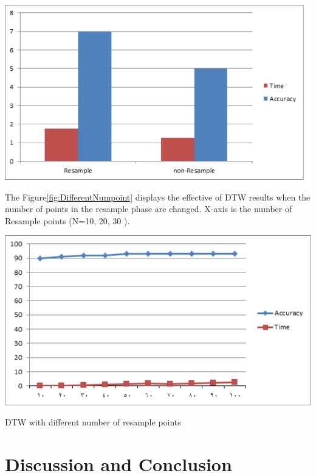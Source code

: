 \documentclass[twoside]{article}
\begin{document}
\begin{multicols}{2}
	\includegraphics[scale=0.5]{../Figures/Resample-NonResample.png}
	\label{fig:Resample-NonResample}

The Figure\ref{fig:DifferentNumpoint} displays the effective of DTW results when the number of points in the resample phase are changed. X-axis is the number of Resample points (N=10, 20, 30 ).

		\includegraphics[scale=0.5]{../Figures/DifferentNumpoint.png}
	\caption{DTW with different number of resample points}
	\label{fig:DifferentNumpoint}

\section {Discussion and Conclusion}

\end{multicols}
\end{document}
